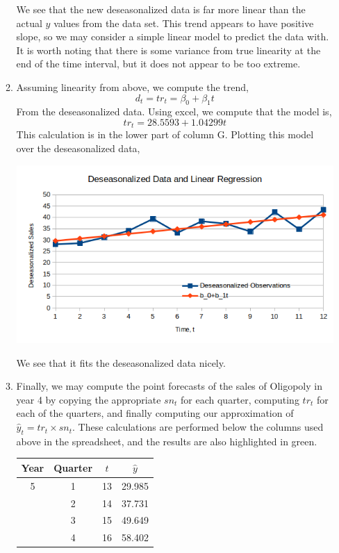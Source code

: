 \documentclass[letterpaper,10pt]{article}
\begin{document}
\begin{enumerate}
\begin{enumerate}
\begin{center}
\end{center}
We see that the new deseasonalized data is far more linear than the actual $y$ values from the data set. This trend appears to have positive slope, so we may consider a simple linear model to predict the data with. It is worth noting that there is some variance from true linearity at the end of the time interval, but it does not appear to be too extreme.
\item Assuming linearity from above, we compute the trend,
\[d_t=tr_t=\beta_0+\beta_1 t\]
From the deseasonalized data. Using excel, we compute that the model is,
\[tr_t=28.5593+1.04299t\]
This calculation is in the lower part of column G. Plotting this model over the deseasonalized data,
\begin{center}
\includegraphics[scale=0.8]{multdeseasonalizedtrend.png}
\end{center}
We see that it fits the deseasonalized data nicely.
\item Finally, we may compute the point forecasts of the sales of Oligopoly in year 4 by copying the appropriate $sn_t$ for each quarter, computing $tr_t$ for each of the quarters, and finally computing our approximation of $\hat{y}_t=tr_t\times sn_t$. These calculations are performed below the columns used above in the spreadsheet, and the results are also highlighted in green.
\begin{center}
\begin{tabular}{|c|c|c|c|}
\hline
Year & Quarter & $t$ & $\hat{y}$ \\\hline
5 & 1 & 13 & 29.985\\
& 2 & 14 & 37.731\\
& 3 & 15 & 49.649\\
& 4 & 16 & 58.402\\\hline
\end{tabular}

\end{center}
\end{enumerate}
\end{enumerate}
\end{document}
